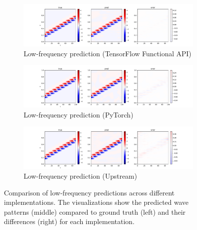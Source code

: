\documentclass[10pt,journal,compsoc,onecolumn]{IEEEtran}
\begin{document}
\begin{figure}[htbp]
    \centering
    \begin{subfigure}[b]{0.3\textwidth}
        \includegraphics[width=\textwidth]{../../results/functional/low-frequency-adabelief-20250206-1105-1/vis}
        \caption{Low-frequency prediction (TensorFlow Functional API)}
        \label{fig:low_freq_functional}
    \end{subfigure}
    \begin{subfigure}[b]{0.3\textwidth}
        \includegraphics[width=\textwidth]{../../results/pytorch/low-frequency-adabelief-20250206-1600-1/vis}
        \caption{Low-frequency prediction (PyTorch)}
        \label{fig:low_freq_pytorch}
    \end{subfigure}
    \begin{subfigure}[b]{0.3\textwidth}
        \includegraphics[width=\textwidth]{../../results/upstream/low-frequency-adabelief-20250206-1105-1/vis}
        \caption{Low-frequency prediction (Upstream)}
        \label{fig:low_freq_upstream}
    \end{subfigure}
    \caption{Comparison of low-frequency predictions across different implementations. The visualizations show the predicted wave patterns (middle) compared to ground truth (left) and their differences (right) for each implementation.}
    \label{fig:low_freq_comparison}
\end{figure}
\end{document}

